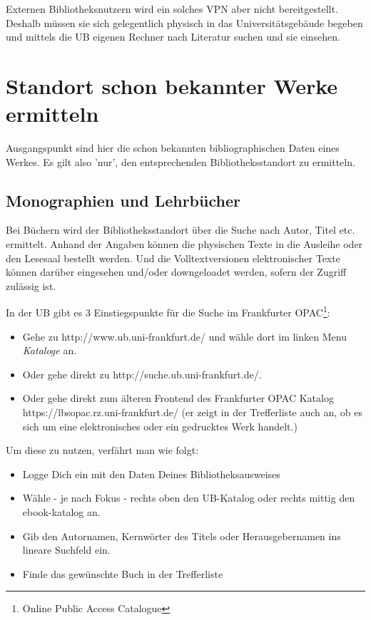 \documentclass[
  DIV=calc,
  BCOR=5mm,
  11pt,
  headings=small,
  oneside,
  abstract=true,
  toc=bib,
  english,ngerman]{scrartcl}
\begin{document}
Externen Bibliotheksnutzern wird ein solches VPN aber nicht bereitgestellt.
Deshalb müssen sie sich gelegentlich physisch in das Universitätsgebäude begeben
und mittels die UB eigenen Rechner nach Literatur suchen und sie einsehen.

\section{Standort schon bekannter Werke ermitteln}

Ausgangspunkt sind hier die schon bekannten bibliographischen Daten eines
Werkes. Es gilt also 'nur', den entsprechenden Bibliotheksstandort zu ermitteln.

\subsection{Monographien und Lehrbücher}

Bei Büchern wird der Bibliotheksstandort über die Suche nach Autor, Titel etc.
ermittelt. Anhand der Angaben können die physischen Texte in die Ausleihe oder
den Lesesaal bestellt werden. Und die  Volltextversionen elektronischer Texte
können darüber eingesehen und/oder downgeloadet werden, sofern der Zugriff
zulässig ist.

In der UB gibt es 3 Einstiegspunkte für die Suche im Frankfurter
OPAC\footnote{Online Public Access Catalogue}:

\begin{itemize}
  \item Gehe zu {\ttfamily http://www.ub.uni-frankfurt.de/} und wähle dort
  im linken Menu \emph{Kataloge} an.
  \item Oder gehe direkt zu {\ttfamily http://suche.ub.uni-frankfurt.de/}.
  \item Oder gehe direkt zum älteren Frontend des
  Frankfurter OPAC Katalog {\ttfamily https://lbsopac.rz.uni-frankfurt.de/} (er
  zeigt in der Trefferliste auch an, ob es sich um eine elektronisches oder ein
  gedrucktes Werk handelt.)
\end{itemize}
  
Um diese zu nutzen, verfährt man wie folgt:

\begin{itemize}
  \item Logge Dich ein mit den Daten Deines Bibliotheksausweises
  \item Wähle - je nach Fokus - rechts oben den UB-Katalog oder rechts mittig
  den ebook-katalog an.
  \item Gib den Autornamen, Kernwörter des Titels oder Herausgebernamen ins
  lineare Suchfeld ein.
  \item Finde das gewünschte Buch in der Trefferliste
\end{itemize}
\end{document}
